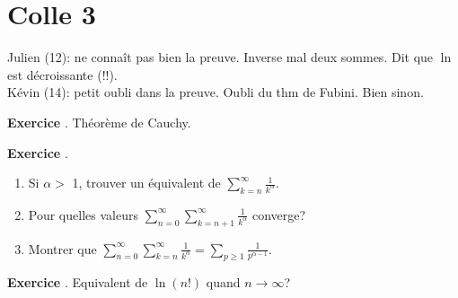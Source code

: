 \documentclass[10pt,a4paper]{article}
\newcounter{question}
\newcounter{exo}
\newenvironment{exo}{\vspace{0.5cm}\setcounter{question}{0}\addtocounter{exo}{1} \noindent \textbf{Exercice \theexo}. \normalsize }{\par}
\begin{document}
	\section*{Colle 3}
	\setcounter{exo}{0}
	Julien (12): ne connaît pas bien la preuve. Inverse mal deux sommes. Dit que $\ln$ est décroissante (!!).\\
	Kévin (14): petit oubli dans la preuve. Oubli du thm de Fubini. Bien sinon.\\
	
	\begin{exo}
		Théorème de Cauchy.
	\end{exo}
	
	\begin{exo}
		\begin{enumerate}
			\item Si $\alpha >$ 1, trouver un équivalent de $\sum_{k=n}^\infty \frac{1}{k^\alpha}$.
			\item Pour quelles valeurs $\sum_{n=0}^\infty \sum_{k=n+1}^\infty \frac{1}{k^\alpha}$ converge?
			\item Montrer que $\sum_{n=0}^\infty \sum_{k=n}^\infty \frac{1}{k^\alpha} = 	\sum_{p\geq1} \frac{1}{p^{\alpha - 1}}$. 
		\end{enumerate}	
	\end{exo}

	\begin{exo}
		Equivalent de $\ln(n!)$ quand $n \longrightarrow \infty$?
	\end{exo}
\end{document}

